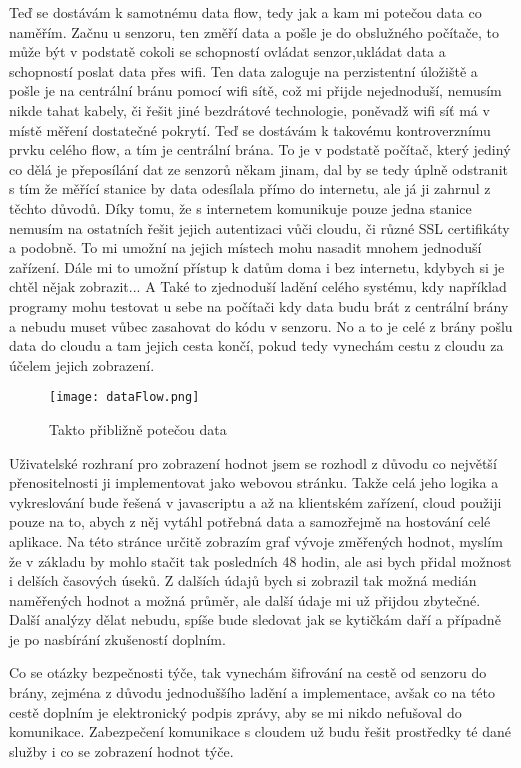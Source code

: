 Teď se dostávám k samotnému data flow, tedy jak a kam mi potečou data co naměřím. Začnu u senzoru, ten změří data 
a pošle je do obslužného počítače, to může být v podstatě cokoli se schopností ovládat senzor,ukládat data a schopností 
poslat data přes wifi. Ten data zaloguje na perzistentní úložiště a pošle je na centrální bránu pomocí wifi sítě, což mi 
přijde nejednoduší, nemusím nikde tahat kabely, či řešit jiné bezdrátové technologie, poněvadž wifi síť má v místě 
měření dostatečné pokrytí. Teď se dostávám k takovému kontroverznímu prvku celého flow, a tím je centrální brána. To je 
v podstatě počítač, který jediný co dělá je přeposílání dat ze senzorů někam jinam, dal by se tedy úplně odstranit s tím 
že měřící stanice by data odesílala přímo do internetu, ale já ji zahrnul z těchto důvodů. Díky tomu, že s internetem 
komunikuje pouze jedna stanice nemusím na ostatních řešit jejich autentizaci vůči cloudu, či různé SSL certifikáty 
a podobně. To mi umožní na jejich místech mohu nasadit mnohem jednoduší zařízení. Dále mi to umožní přístup k datům doma 
i bez internetu, kdybych si je chtěl nějak zobrazit... A Také to zjednoduší ladění celého systému, kdy například 
programy mohu testovat u sebe na počítači kdy data budu brát z centrální brány a nebudu muset vůbec zasahovat do kódu 
v senzoru. No a to je celé z brány pošlu data do cloudu a tam jejich cesta končí, pokud tedy vynechám cestu z cloudu za 
účelem jejich zobrazení.
\begin{figure}[h]
		\centering
		\texttt{[image: dataFlow.png]}
		\caption{Takto přibližně potečou data}
\end{figure}

Uživatelské rozhraní pro zobrazení hodnot jsem se rozhodl z důvodu co největší přenositelnosti ji implementovat jako 
webovou stránku. Takže celá jeho logika a vykreslování bude řešená v javascriptu a až na klientském zařízení, cloud 
použiji pouze na to, abych z něj vytáhl potřebná data a samozřejmě na hostování celé aplikace. Na této stránce určitě 
zobrazím graf vývoje změřených hodnot, myslím že v základu by mohlo stačit tak posledních 48 hodin, ale asi bych přidal 
možnost i delších časových úseků. Z dalších údajů bych si zobrazil tak možná medián naměřených hodnot a možná průměr, 
ale další údaje mi už přijdou zbytečné. Další analýzy dělat nebudu, spíše  bude sledovat jak se kytičkám daří a případně 
je po nasbírání zkušeností doplním.

Co se otázky bezpečnosti týče, tak vynechám šifrování na cestě od senzoru do brány, zejména z důvodu jednoduššího ladění 
a implementace, avšak co na této cestě doplním je elektronický podpis zprávy, aby se mi nikdo nefušoval do komunikace. 
Zabezpečení komunikace s cloudem už budu řešit prostředky té dané služby i co se zobrazení hodnot týče.
